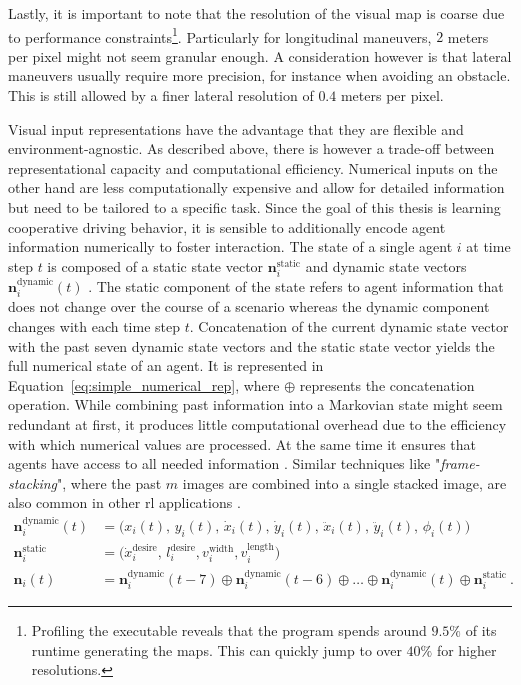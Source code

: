 Lastly, it is important to note that the resolution of the visual map is coarse due to performance constraints\footnote{Profiling the executable reveals that the program spends around $9.5 \%$ of its runtime generating the maps. This can quickly jump to over $40 \%$ for higher resolutions.}. Particularly for longitudinal maneuvers, $2$ meters per pixel might not seem granular enough. A consideration however is that lateral maneuvers usually require more precision, for instance when avoiding an obstacle. This is still allowed by  a finer lateral resolution of $0.4$ meters per pixel.

Visual input representations have the advantage that they are flexible and environment-agnostic. As described above, there is however a trade-off between representational capacity and computational efficiency. Numerical inputs on the other hand are less computationally expensive and allow for detailed information but need to be tailored to a specific task. Since the goal of this thesis is learning cooperative driving behavior, it is sensible to additionally encode agent information numerically to foster interaction. The state of a single agent $i$ at time step $t$ is composed of a static state vector $\mathbf n_i^{\text{static}}$ and dynamic state vectors $\mathbf n_i^{\text{dynamic}} (t)$ \cite{kurzerAcceleratingCooperativePlanning2020}. The static component of the state refers to agent information that does not change over the course of a scenario whereas the dynamic component changes with each time step $t$. Concatenation of the current dynamic state vector with the past seven dynamic state vectors and the static state vector yields the full numerical state of an agent. It is represented in  Equation~\ref{eq:simple_numerical_rep}, where $\oplus$ represents the concatenation operation. While combining past information into a Markovian state might seem redundant at first, it produces little computational overhead due to the efficiency with which numerical values are processed. At the same time it ensures that agents have access to all needed information \cite{kurzerAcceleratingCooperativePlanning2020}. Similar techniques like "\emph{frame-stacking}", where the past $m$ images are combined into a single stacked image, are also common in other \gls{rl} applications \cite{mnihHumanlevelControlDeep2015}.
\begin{align}\label{eq:simple_numerical_rep}
    \mathbf n_i^{\text{dynamic}} (t) & = \big( x_i (t), \, y_i (t), \, \dot x_i (t), \, \dot y_i (t), \, \ddot x_i (t), \, \ddot y_i (t), \, \phi_i (t) \big) \nonumber \\
    \mathbf n_i^{\text{static}} & = \big( \dot x_i^{\text{desire}}, \, l_i^{\text{desire}}, v_i^{\text{width}}, v_i^{\text{length}} \big) \nonumber \\ 
    \mathbf n_i (t) & = \mathbf n_i^{\text{dynamic}} (t-7) \oplus \mathbf n_i^{\text{dynamic}} (t-6) \oplus \ldots \oplus \mathbf n_i^{\text{dynamic}} (t) \oplus \mathbf n_i^{\text{static}}~.
\end{align}
